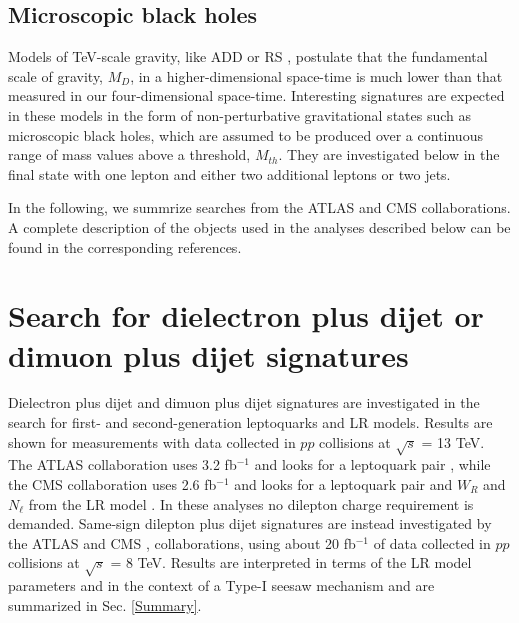\documentclass[10pt]{article}
\begin{document}
\subsection{Microscopic black holes}
\vspace{-0.15cm}
Models of TeV-scale gravity, like ADD \cite{ADD} or RS \cite{RS}, postulate that the fundamental scale of gravity, $M_{D}$, in a higher-dimensional
space-time is much lower than that measured in our four-dimensional space-time.
Interesting signatures are expected in these models in the form of
non-perturbative gravitational states such as microscopic black holes, which are assumed to be produced over a continuous range of mass values above a threshold, $M_{th}$.
They are investigated below in the final state with one lepton and either two additional leptons or two jets.

In the following, we summrize searches from the ATLAS and CMS collaborations.
A complete description of the objects used in the analyses described below can be found in the corresponding references.

\vspace{-0.5cm}
\section{Search for dielectron plus dijet or dimuon plus dijet signatures}
\vspace{-0.15cm}
Dielectron plus dijet and dimuon plus dijet signatures are investigated in the search for first- and second-generation leptoquarks and LR models.
Results are shown for measurements with data collected in $pp$ collisions at $\sqrt{s}$ = 13 TeV. 
The ATLAS collaboration uses 3.2 fb$^{-1}$ and looks for a leptoquark pair \cite{LQ_ATLAS}, while 
the CMS collaboration uses 2.6 fb$^{-1}$ and looks for a leptoquark pair \cite{LQ1_CMS,LQ2_CMS} and $W_R$ and $N_{\ell}$ from the LR model \cite{LR_CMS}. In these analyses no dilepton charge requirement is demanded.
Same-sign dilepton plus dijet signatures are instead investigated 
by the ATLAS \cite{lljj8TeV_ATLAS} and CMS \cite{lljj8TeV_CMS1}, \cite{lljj8TeV_CMS2} collaborations, using about 20 fb$^{-1}$ of data collected in $pp$ collisions at $\sqrt{s}$ = 8 TeV.
Results are interpreted in terms of the LR model parameters and in the context of a Type-I seesaw mechanism and are summarized in Sec. \ref{Summary}.
\end{document}
